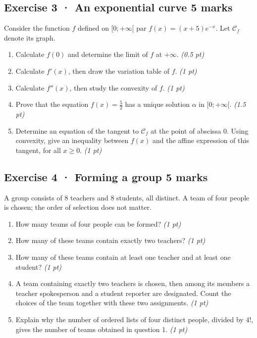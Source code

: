 \clearpage{}\par

\subsection*{Exercise 3 · An exponential curve \hfill 5 marks}Consider the function $f$ defined on $[0;+\infty[$ par $f(x)=(x+5)e^{-x}$. Let $\mathcal C_f$ denote its graph.

\begin{enumerate}

\item Calculate $f(0)$ and determine the limit of $f$ at $+\infty$. \hfill\textit{(0.5 pt)}

\item Calculate $f'(x)$, then draw the variation table of $f$. \hfill\textit{(1 pt)}

\item Calculate $f''(x)$, then study the convexity of $f$. \hfill\textit{(1 pt)}

\item Prove that the equation $f(x)=\frac{5}{2}$ has a unique solution $\alpha$ in $[0;+\infty[$. \hfill\textit{(1.5 pt)}

\item Determine an equation of the tangent to $\mathcal C_f$ at the point of abscissa $0$. Using convexity, give an inequality between $f(x)$ and the affine expression of this tangent, for all $x\ge0$. \hfill\textit{(1 pt)}

\end{enumerate}

\subsection*{Exercise 4 · Forming a group \hfill 5 marks}A group consists of $8$ teachers and $8$ students, all distinct. A team of four people is chosen; the order of selection does not matter.

\begin{enumerate}

\item How many teams of four people can be formed? \hfill\textit{(1 pt)}

\item How many of these teams contain exactly two teachers? \hfill\textit{(1 pt)}

\item How many of these teams contain at least one teacher and at least one student? \hfill\textit{(1 pt)}

\item A team containing exactly two teachers is chosen, then among its members a teacher spokesperson and a student reporter are designated. Count the choices of the team together with these two assignments. \hfill\textit{(1 pt)}

\item Explain why the number of ordered lists of four distinct people, divided by $4!$, gives the number of teams obtained in question 1. \hfill\textit{(1 pt)}

\end{enumerate}

